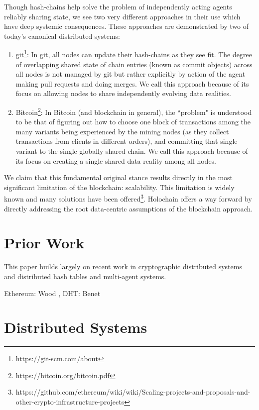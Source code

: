 \documentclass[twocolumn,showpacs,
  nofootinbib,aps,superscriptaddress,
  eqsecnum,prd,notitlepage,showkeys,10pt]{revtex4-1}
\begin{document}
Though hash-chains help solve the problem of independently acting agents reliably sharing state, we see two very different approaches in their use which have deep systemic consequences.  These approaches are demonstrated by two of today's canonical distributed systems: \begin{enumerate}
\item git\footnote{https://git-scm.com/about}:  In git, all nodes can update their hash-chains as they see fit.  The degree of overlapping shared state of chain entries (known as commit objects) across all nodes is not managed by git but rather explicitly by action of the agent making pull requests and doing merges.  We call this approach  because of its focus on allowing nodes to share independently evolving data realities.
\item Bitcoin\footnote{https://bitcoin.org/bitcoin.pdf}: In Bitcoin (and blockchain in general), the ``problem" is understood to be that of figuring out how to choose one block of transactions among the many variants being experienced by the mining nodes (as they collect transactions from clients in different orders), and committing that single variant to the single globally shared chain. We call this approach  because of its focus on creating a single shared data reality among all nodes.
\end{enumerate}

We claim that this fundamental original stance results directly in the most significant limitation of the blockchain: scalability.  This limitation is widely known and many solutions have been offered\footnote{https://github.com/ethereum/wiki/wiki/Scaling-projects-and-proposals-and-other-crypto-infrastructure-projects}.  Holochain offers a way forward by directly addressing the root data-centric assumptions of the blockchain approach.

\section{Prior Work}
This paper builds largely on recent work in cryptographic distributed systems and distributed hash tables and multi-agent systems.

Ethereum: Wood \cite{yellowpaper}, DHT: \cite{kademlia}  Benet \cite{ipfs}



\section{Distributed Systems}
\label{sec:data-centric-systems}
\end{document}
